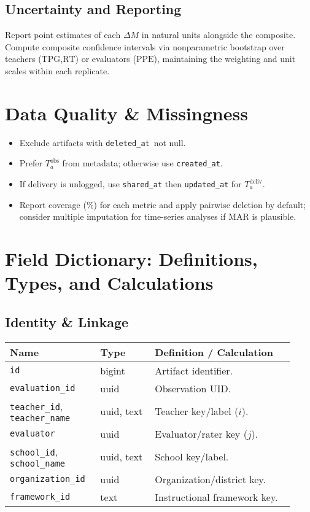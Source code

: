 \documentclass[11pt]{article}
\newcommand{\TPG}{\mathrm{TPG}}
\newcommand{\PPE}{\mathrm{PPE}}
\newcommand{\RT}{\mathrm{RT}}
\begin{document}
\subsection{Uncertainty and Reporting}
Report point estimates of each $\Delta M$ in natural units alongside the composite. Compute composite confidence intervals via nonparametric bootstrap over teachers ($\TPG$,$\RT$) or evaluators ($\PPE$), maintaining the weighting and unit scales within each replicate.

\section{Data Quality \& Missingness}
\begin{itemize}[leftmargin=2em]
  \item Exclude artifacts with \texttt{deleted\_at} \,not null.
  \item Prefer $T^{\mathrm{obs}}_a$ from metadata; otherwise use \texttt{created\_at}.
  \item If delivery is unlogged, use \texttt{shared\_at} then \texttt{updated\_at} for $T^{\mathrm{deliv}}_a$.
  \item Report coverage (\%) for each metric and apply pairwise deletion by default; consider multiple imputation for time-series analyses if MAR is plausible.
\end{itemize}

\appendix

\section{Field Dictionary: Definitions, Types, and Calculations}
\subsection*{Identity \& Linkage}
\begin{longtable}{@{}p{0.28\linewidth}p{0.18\linewidth}p{0.46\linewidth}@{}}
\toprule
\textbf{Name} & \textbf{Type} & \textbf{Definition / Calculation} \\
\midrule
\endhead
\texttt{id} & bigint & Artifact identifier. \\
\texttt{evaluation\_id} & uuid & Observation UID. \\
\texttt{teacher\_id}, \texttt{teacher\_name} & uuid, text & Teacher key/label ($i$). \\
\texttt{evaluator} & uuid & Evaluator/rater key ($j$). \\
\texttt{school\_id}, \texttt{school\_name} & uuid, text & School key/label. \\
\texttt{organization\_id} & uuid & Organization/district key. \\
\texttt{framework\_id} & text & Instructional framework key. \\
\bottomrule
\end{longtable}
\end{document}
